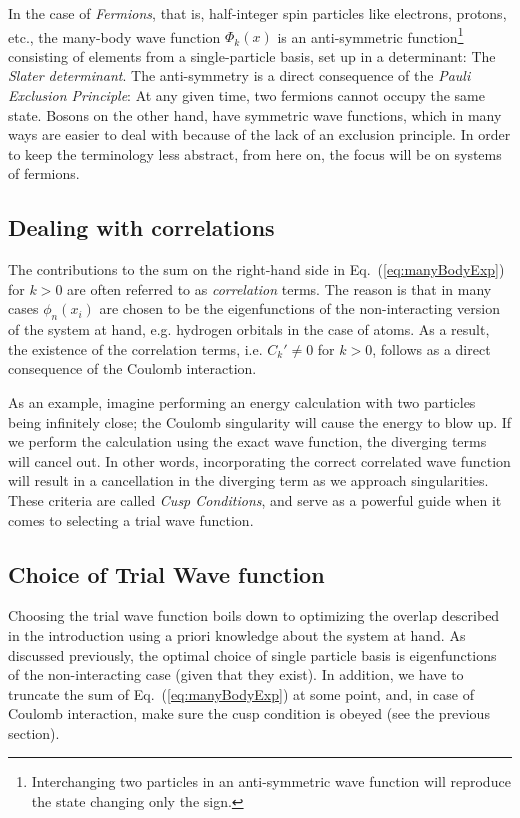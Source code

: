 In the case of \textit{Fermions}, that is, half-integer spin particles like electrons, protons, etc., the many-body wave function $\Phi_k(x)$ is an anti-symmetric function\footnote{Interchanging two particles in an anti-symmetric wave function will reproduce the state changing only the sign.} consisting of elements from a single-particle basis, set up in a determinant: The \textit{Slater determinant}. The anti-symmetry is a direct consequence of the \textit{Pauli Exclusion Principle}: At any given time, two fermions cannot occupy the same state. Bosons on the other hand, have symmetric wave functions, which in many ways are easier to deal with because of the lack of an exclusion principle. In order to keep the terminology less abstract, from here on, the focus will be on systems of fermions.

\subsection{Dealing with correlations}

The contributions to the sum on the right-hand side in Eq.~(\ref{eq:manyBodyExp}) for $k>0$ are often referred to as \textit{correlation} terms. The reason  is that in many cases $\phi_n(x_i)$ are chosen to be the eigenfunctions of the non-interacting version of the system at hand, e.g. hydrogen orbitals in the case of atoms. As a result, the existence of the correlation terms, i.e. $C_k' \ne 0$ for $k>0$, follows as a direct consequence of the Coulomb interaction.

As an example, imagine performing an energy calculation with two particles being infinitely close; the Coulomb singularity will cause the energy to blow up. If we perform the calculation using the exact wave function, the diverging terms will cancel out. In other words, incorporating the correct correlated wave function will result in a cancellation in the diverging term as we approach singularities. These criteria are called \textit{Cusp Conditions}, and serve as a powerful guide when it comes to selecting a trial wave function. 

\subsection{Choice of Trial Wave function}

Choosing the trial wave function boils down to optimizing the overlap described in the introduction using a priori knowledge about the system at hand. As discussed previously, the optimal choice of single particle basis is eigenfunctions of the non-interacting case (given that they exist). In addition, we have to truncate the sum of Eq.~(\ref{eq:manyBodyExp}) at some point, and, in case of Coulomb interaction, make sure the cusp condition is obeyed (see the previous section).

